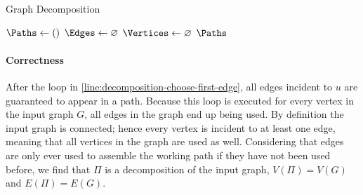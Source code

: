 \begin{algorithm}[H]
  \caption{Graph Decomposition}
  \label{algo:greedy-graph-decomposition}
  \vspace{5pt}
  \vspace{10pt}
  ${\Paths \gets ()}$\;
  ${\Edges \gets \varnothing}$\;
  ${\Vertices \gets \varnothing}$\;
  \;
  \;
  \Return ${\Paths}$
\end{algorithm}
\vspace*{\fill}



\paragraph{Correctness}

After the loop in \cref{line:decomposition-choose-first-edge}, all edges incident to ${u}$ are guaranteed to appear in a path. Because this loop is executed for every vertex in the input graph ${G}$, all edges in the graph end up being used. By definition the input graph is connected; hence every vertex is incident to at least one edge, meaning that all vertices in the graph are used as well. Considering that edges are only ever used to assemble the working path if they have not been used before, we find that ${\Pi}$ is a decomposition of the input graph, \ie{} ${V(\Pi) = V(G)}$ and ${E(\Pi) = E(G)}$.

